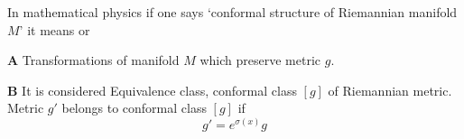 





\baselineskip=14pt
\def\vare {\varepsilon}
\def\A {{\bf A}}
\def\a {\alpha}
\def\N {{\bf N}}
\def\s {{\sigma}}
\def\bs {{\bf s}}
\def\S {{\Sigma}}
\def\s {{\sigma}}
\def\d {{\delta}}
\def\p{\partial}
\def\vare{{\varepsilon}}
\def\Q {{\bf Q}}
\def\D {{\cal D}}
\def\g {{\Gamma}}
\def\C {{\bf C}}
\def\M {{\cal M}}
\def\Z {{\bf Z}}
\def\U  {{\cal U}}
\def\H {{\cal H}}
\def\R  {{\bf R}}
\def\S  {{\bf S}}
\def\E  {{\bf E}}
\def\l {\lambda}
\def\degree {{\bf {\rm degree}\,\,}}
\def \finish {${\,\,\vrule height1mm depth2mm width 8pt}$}
\def \m {\medskip}
\def\p {\partial}
\def\g {{\Gamma}}
\def\v {{\bf v}}
\def\n {{\bf n}}
\def\t {{\tilde}}
\def\b {{\bf b}}
\def\c {{\bf c }}
\def\e{{\bf e}}
\def\ac {{\bf a}}
\def \X   {{\bf X}}
\def \Y   {{\bf Y}}
\def \x   {{\bf x}}
\def \y   {{\bf y}}
\def \G{{\cal G}}
\def\w{\omega}
\def\pt {{\bf pt}}
\def\finish {${\,\,\vrule height1mm depth2mm width 8pt}$}

In mathematical physics if one says `conformal structure of 
Riemannian manifold $M$'
it means or

{\bf A}  Transformations of manifold $M$ which preserve
  metric $g$.   

{\bf B}  It is considered Equivalence class, conformal class  $[g]$
of Riemannian metric. Metric $g'$ belongs to conformal class $[g]$
if 
           $$
     g'=e^{\s(x)}g
           $$  

